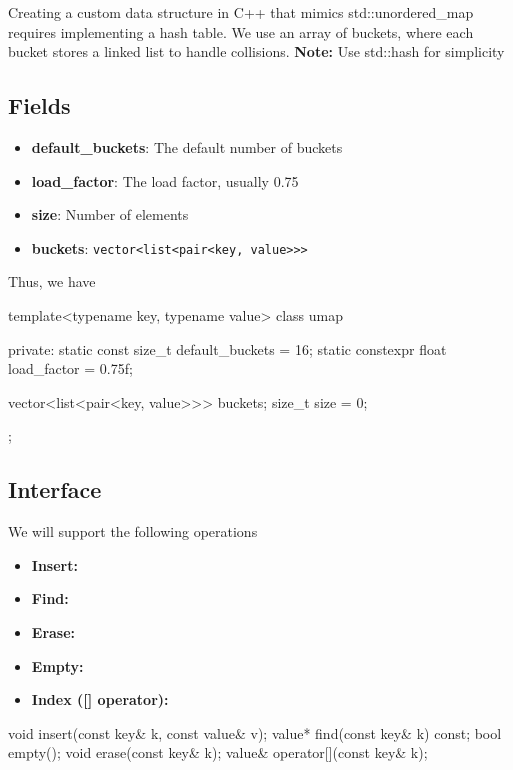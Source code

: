 \documentclass{report}
\begin{document}
 \pagebreak 
 \bigbreak \noindent 
 Creating a custom data structure in C++ that mimics std::unordered\_map requires implementing a hash table. We use an array of buckets, where each bucket stores a linked list to handle collisions.
 \bigbreak \noindent 
 \textbf{Note:} Use std::hash for simplicity
 \bigbreak \noindent 
 \subsection{Fields}
 \bigbreak \noindent 
 \begin{itemize}
     \item \textbf{default\_buckets}: The default number of buckets
    \item \textbf{load\_factor}:  The load factor, usually 0.75
    \item \textbf{size}: Number of elements
    \item \textbf{buckets}: \texttt{vector<list<pair<key, value>>>}
 \end{itemize}
 Thus, we have
 \bigbreak \noindent 
 \begin{cppcode}
     template<typename key, typename value>
     class umap {
         private:
         static const size_t default_buckets = 16;
         static constexpr float load_factor = 0.75f;

         vector<list<pair<key, value>>> buckets;
         size_t size = 0;
     };  
 \end{cppcode}

 \bigbreak \noindent 
 \subsection{Interface}
 \bigbreak \noindent 
 We will support the following operations
 \begin{itemize}
     \item \textbf{Insert:} 
     \item \textbf{Find:} 
     \item \textbf{Erase:}
     \item \textbf{Empty:}
     \item \textbf{Index ([] operator):}
 \end{itemize}
 \bigbreak \noindent 
 \begin{cppcode}
    void insert(const key& k, const value& v);
    value* find(const key& k) const;
    bool empty();
    void erase(const key& k);
    value& operator[](const key& k);
 \end{cppcode}
\end{document}
